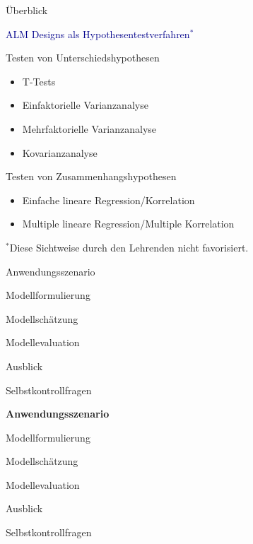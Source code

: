 \documentclass[
  8pt,
  ignorenonframetext,
]{beamer}
\providecommand{\tightlist}{%
  \setlength{\itemsep}{0pt}\setlength{\parskip}{0pt}}
\begin{document}
\begin{frame}{Überblick}
\protect\hypertarget{uxfcberblick-1}{}

\textcolor{darkblue}{ALM Designs als Hypothesentestverfahren$^\ast$}

Testen von Unterschiedshypothesen

\begin{itemize}
\tightlist
\item
  T-Tests
\item
  Einfaktorielle Varianzanalyse
\item
  Mehrfaktorielle Varianzanalyse
\item
  Kovarianzanalyse
\end{itemize}

Testen von Zusammenhangshypothesen

\begin{itemize}
\tightlist
\item
  Einfache lineare Regression/Korrelation
\item
  Multiple lineare Regression/Multiple Korrelation
\end{itemize}

\(^\ast\)Diese Sichtweise durch den Lehrenden nicht favorisiert.
\end{frame}

\begin{frame}{}
\protect\hypertarget{section-3}{}
\large
{}
\vfill

Anwendungsszenario

Modellformulierung

Modellschätzung

Modellevaluation

Ausblick

Selbstkontrollfragen \vfill
\end{frame}

\begin{frame}{}
\protect\hypertarget{section-4}{}
\large
{}
\vfill

\textbf{Anwendungsszenario}

Modellformulierung

Modellschätzung

Modellevaluation

Ausblick

Selbstkontrollfragen \vfill
\end{frame}
\end{document}
